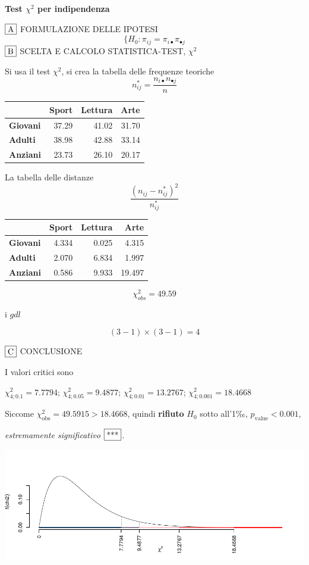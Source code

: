 \documentclass[
  11pt,
]{book}
\theoremstyle{mytheoremstyle}
\theoremstyle{mydefstyle}
\newenvironment{sol}
  {
  \begin{tcolorbox}[enhanced,breakable,arc=0.1mm,boxrule=1pt,colback=white,colframe=iblue,
  title=\bf \fontfamily{lmss}\selectfont \hspace{.5 cm} Soluzione,drop fuzzy shadow]

}{
\end{tcolorbox}
  }
\begin{document}
\begin{sol}
\textbf{Test \(\chi^2\) per indipendenza}

\(\fbox{A}\) FORMULAZIONE DELLE IPOTESI
\[
\Big\{H_0:\pi_{ij}=\pi_{i\bullet}\pi_{\bullet j}
\]
\(\fbox{B}\) SCELTA E CALCOLO STATISTICA-TEST, \(\chi^2\)

Si usa il test \(\chi^2\), si crea la tabella delle frequenze teoriche
\[
n_{ij}^*=\frac{n_{i\bullet}n_{\bullet j}}{n}
\]

\begin{table}[H]
\centering
\begin{tabular}{>{}lrrr}
\toprule
  & Sport & Lettura & Arte\\
\midrule
\textbf{Giovani} & 37.29 & 41.02 & 31.70\\
\textbf{Adulti} & 38.98 & 42.88 & 33.14\\
\textbf{Anziani} & 23.73 & 26.10 & 20.17\\
\bottomrule
\end{tabular}
\end{table}

La tabella delle distanze
\[
\frac{(n_{ij}-n_{ij}^*)^2}{n_{ij}^*}
\]

\begin{table}[H]
\centering
\begin{tabular}{>{}lrrr}
\toprule
  & Sport & Lettura & Arte\\
\midrule
\textbf{Giovani} & 4.334 & 0.025 & 4.315\\
\textbf{Adulti} & 2.070 & 6.834 & 1.997\\
\textbf{Anziani} & 0.586 & 9.933 & 19.497\\
\bottomrule
\end{tabular}
\end{table}

\[
    \chi^2_{obs}= 49.59 
  \]

i \(gdl\)

\[
    ( 3 -1)\times( 3 -1)= 4 
  \]

\(\fbox{C}\) CONCLUSIONE

I valori critici sono

\(\chi^2_{4;0.1}=7.7794\); \(\chi^2_{4;0.05}=9.4877\); \(\chi^2_{4;0.01}=13.2767\); \(\chi^2_{4;0.001}=18.4668\)

Siccome \(\chi^2_\text{obs}=49.5915>18.4668\), quindi \textbf{rifiuto} \(H_0\) sotto all'1‰, \(p_\text{value}<0.001\),

\emph{estremamente significativo} \(\fbox{***}\).

\begin{center}\includegraphics{Esami_passati_con_soluzioni_files/figure-latex/05a-chi2-8-1} \end{center}


\end{sol}
\end{document}
